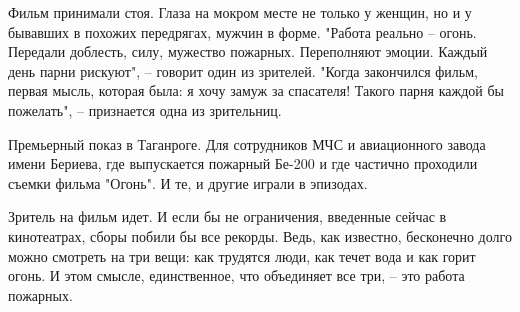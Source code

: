 Фильм принимали стоя. Глаза на мокром месте не только у женщин, но и у бывавших
в похожих передрягах, мужчин в форме. "Работа реально – огонь. Передали
доблесть, силу, мужество пожарных. Переполняют эмоции. Каждый день парни
рискуют", – говорит один из зрителей. "Когда закончился фильм, первая мысль,
которая была: я хочу замуж за спасателя! Такого парня каждой бы пожелать", –
признается одна из зрительниц.

Премьерный показ в Таганроге. Для сотрудников МЧС и авиационного завода имени
Бериева, где выпускается пожарный Бе-200 и где частично проходили съемки фильма
"Огонь". И те, и другие играли в эпизодах.

Зритель на фильм идет. И если бы не ограничения, введенные сейчас в
кинотеатрах, сборы побили бы все рекорды. Ведь, как известно, бесконечно долго
можно смотреть на три вещи: как трудятся люди, как течет вода и как горит
огонь. И этом смысле, единственное, что объединяет все три, – это работа
пожарных.
